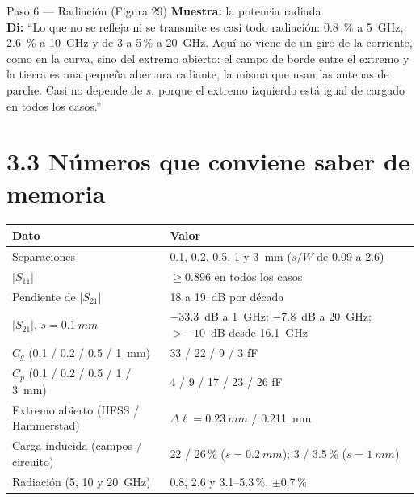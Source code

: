 \documentclass[11pt,letterpaper]{article}
\begin{document}
\begin{paso}{Paso 6 --- Radiación (Figura 29)}
\textbf{Muestra:} la potencia radiada.\\
\textbf{Di:} ``Lo que no se refleja ni se transmite es casi todo radiación: \SI{0.8}{\percent} a \SI{5}{GHz}, \SI{2.6}{\percent} a \SI{10}{GHz} y de 3 a 5\,\% a \SI{20}{GHz}. Aquí no viene de un giro de la corriente, como en la curva, sino del extremo abierto: el campo de borde entre el extremo y la tierra es una pequeña abertura radiante, la misma que usan las antenas de parche. Casi no depende de $s$, porque el extremo izquierdo está igual de cargado en todos los casos.''
\end{paso}

\section*{3.3 Números que conviene saber de memoria}
\begin{center}
\small
\begin{tabular}{ll}
\toprule
Dato & Valor \\
\midrule
Separaciones & 0.1, 0.2, 0.5, 1 y \SI{3}{mm} ($s/W$ de 0.09 a 2.6) \\
$|S_{11}|$ & $\geq 0.896$ en todos los casos \\
Pendiente de $|S_{21}|$ & 18 a 19~dB por década \\
$|S_{21}|$, $s=\SI{0.1}{mm}$ & \SI{-33.3}{dB} a \SI{1}{GHz}; \SI{-7.8}{dB} a \SI{20}{GHz}; $>-10$~dB desde \SI{16.1}{GHz} \\
$C_g$ (0.1 / 0.2 / 0.5 / \SI{1}{mm}) & 33 / 22 / 9 / 3 fF \\
$C_p$ (0.1 / 0.2 / 0.5 / 1 / \SI{3}{mm}) & 4 / 9 / 17 / 23 / 26 fF \\
Extremo abierto (HFSS / Hammerstad) & $\Delta\ell=\SI{0.23}{mm}$ / \SI{0.211}{mm} \\
Carga inducida (campos / circuito) & 22 / 26\,\% ($s=\SI{0.2}{mm}$); 3 / 3.5\,\% ($s=\SI{1}{mm}$) \\
Radiación (5, 10 y \SI{20}{GHz}) & 0.8, 2.6 y 3.1--5.3\,\%, $\pm$0.7\,\% \\
\bottomrule
\end{tabular}
\end{center}
\end{document}
